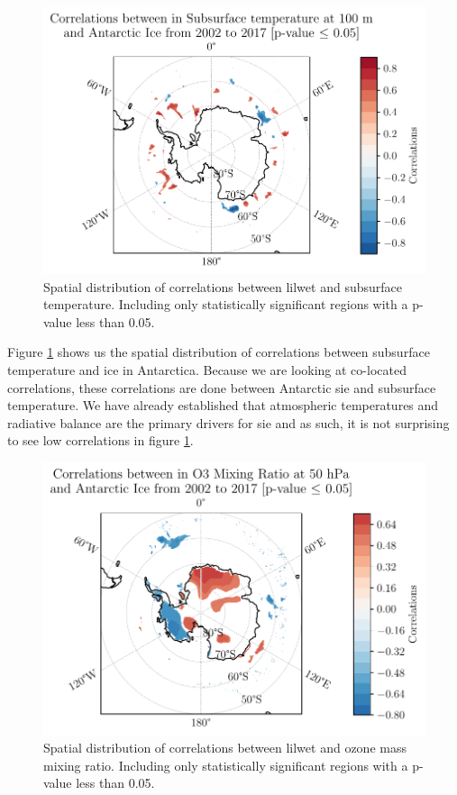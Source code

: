 \documentclass[../main.tex]{subfiles}
\begin{document}
\begin{figure}[hbt!]
    \centering
    \includegraphics{images/2021w5/chapter7/hres/correlation_spatial_subsurtemp_100}
    \caption{Spatial distribution of correlations between \gls{lilwet} and subsurface temperature. Including only statistically significant regions with a p-value less than 0.05.}
    \label{fig:correlation_spatial_subsurtemp_100}
\end{figure}

Figure \ref{fig:correlation_spatial_subsurtemp_100} shows us the spatial distribution of correlations between subsurface temperature and ice in Antarctica.  Because we are looking at co-located correlations, these correlations are done between Antarctic \gls{sie} and subsurface temperature. We have already established that atmospheric temperatures and radiative balance are the primary drivers for \gls{sie} and as such, it is not surprising to see low correlations in figure \ref{fig:correlation_spatial_subsurtemp_100}.

\begin{figure}[hbt!]
    \centering
    \includegraphics{images/2021w5/chapter7/hres/correlation_spatial_o3_50}
    \caption{Spatial distribution of correlations between \gls{lilwet} and ozone mass mixing ratio. Including only statistically significant regions with a p-value less than 0.05.}
    \label{fig:correlation_spatial_o3_50}
\end{figure}
\end{document}
